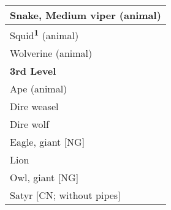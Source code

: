 \begin{longtable}{ll}
\hline
\multicolumn{2}{|p{3.857in}|}{\begin{minipage}[t]{3.857in}\raggedright
Snake, Medium viper (animal)\end{minipage}}\\
\hline
\multicolumn{2}{|p{3.857in}|}{\begin{minipage}[t]{3.857in}\raggedright
Squid\textsuperscript{\textbf{1}}\textbf{} (animal)\end{minipage}}\\
\hline
\multicolumn{2}{|p{3.857in}|}{\begin{minipage}[t]{3.857in}\raggedright
Wolverine (animal)\end{minipage}}\\
\hline
\multicolumn{2}{|p{3.857in}|}{\begin{minipage}[t]{3.857in}\raggedright
\textbf{3rd Level}\end{minipage}}\\
\hline
\multicolumn{2}{|p{3.857in}|}{\begin{minipage}[t]{3.857in}\raggedright
Ape (animal)\end{minipage}}\\
\hline
\multicolumn{2}{|p{3.857in}|}{\begin{minipage}[t]{3.857in}\raggedright
Dire weasel\end{minipage}}\\
\hline
\multicolumn{2}{|p{3.857in}|}{\begin{minipage}[t]{3.857in}\raggedright
Dire wolf\end{minipage}}\\
\hline
\multicolumn{2}{|p{3.857in}|}{\begin{minipage}[t]{3.857in}\raggedright
Eagle, giant [NG]\end{minipage}}\\
\hline
\multicolumn{2}{|p{3.857in}|}{\begin{minipage}[t]{3.857in}\raggedright
Lion\end{minipage}}\\
\hline
\multicolumn{2}{|p{3.857in}|}{\begin{minipage}[t]{3.857in}\raggedright
Owl, giant [NG]\end{minipage}}\\
\hline
\multicolumn{2}{|p{3.857in}|}{\begin{minipage}[t]{3.857in}\raggedright
Satyr [CN; without pipes]\end{minipage}}\\

\end{longtable}
